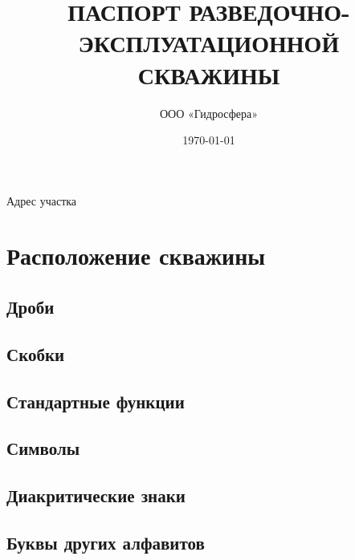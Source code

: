 \documentclass[a4paper,12pt]{article} %
\author{ООО «Гидросфера»}\label{company}
\title{ПАСПОРТ РАЗВЕДОЧНО-ЭКСПЛУАТАЦИОННОЙ СКВАЖИНЫ}
\date{\today}
\begin{document}

	\maketitle
	
	Адрес участка 
		
	\section{Расположение скважины}
	
	\subsection{Дроби}
	
	\subsection{Скобки}
	
	\subsection{Стандартные функции}
	
	\subsection{Символы}
	
	\subsection{Диакритические знаки}
	
	\subsection{Буквы других алфавитов}
	
\end{document}
